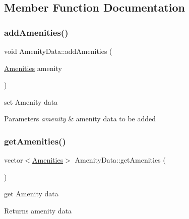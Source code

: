 \subsection{Member Function Documentation}
\mbox{\label{class_amenity_data_a137cde3c490e6522c9bb266723b845c3}} 
\subsubsection{\texorpdfstring{add\+Amenities()}{addAmenities()}}
{\footnotesize\ttfamily void Amenity\+Data\+::add\+Amenities (\begin{DoxyParamCaption}\item[{\hyperlink{class_amenities}{Amenities}}]{amenity }\end{DoxyParamCaption})\hspace{0.3cm}{\ttfamily [inline]}}

set Amenity data 
\begin{DoxyParams}{Parameters}
{\em amenity} & amenity data to be added \\
\hline
\end{DoxyParams}
\mbox{\label{class_amenity_data_a634841fb7bdd634e6820c06ec4aaa22e}} 
\subsubsection{\texorpdfstring{get\+Amenities()}{getAmenities()}}
{\footnotesize\ttfamily vector$<$\hyperlink{class_amenities}{Amenities}$>$ Amenity\+Data\+::get\+Amenities (\begin{DoxyParamCaption}{ }\end{DoxyParamCaption})\hspace{0.3cm}{\ttfamily [inline]}}

get Amenity data \begin{DoxyReturn}{Returns}
amenity data 
\end{DoxyReturn}
\mbox{\label{class_amenity_data_a93e84a15fcfd8a2833179c697ced29ae}} 
